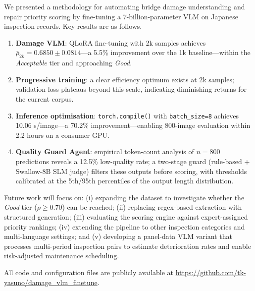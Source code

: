 \documentclass[twocolumn]{article}
\begin{document}
We presented a methodology for automating bridge damage understanding and
repair priority scoring by fine-tuning a 7-billion-parameter VLM on
Japanese inspection records.
Key results are as follows.
\begin{enumerate}[leftmargin=*,itemsep=1pt]
  \item \textbf{Damage VLM}: QLoRA fine-tuning with 2k samples achieves
        $\bar{\rho}_{2k}=0.6850\pm0.0814$---a 5.5\% improvement over the
        1k baseline---within the \textit{Acceptable} tier and approaching
        \textit{Good}.
  \item \textbf{Progressive training}: a clear efficiency optimum exists
        at 2k samples; validation loss plateaus beyond this scale, indicating
        diminishing returns for the current corpus.
  \item \textbf{Inference optimisation}: \texttt{torch.compile()} with
        \texttt{batch\_size=8} achieves 10.06 s/image---a 70.2\%
        improvement---enabling 800-image evaluation within 2.2 hours on a
        consumer GPU.
  \item \textbf{Quality Guard Agent}: empirical token-count analysis of
        $n=800$ predictions reveals a 12.5\% low-quality rate; a two-stage
        guard (rule-based + Swallow-8B SLM judge) filters these outputs
        before scoring, with thresholds calibrated at the 5th/95th
        percentiles of the output length distribution.
\end{enumerate}

Future work will focus on: (i) expanding the dataset to investigate
whether the \textit{Good} tier ($\bar{\rho}\geq 0.70$) can be reached;
(ii) replacing regex-based extraction with structured generation;
(iii) evaluating the scoring engine against expert-assigned priority rankings;
(iv) extending the pipeline to other inspection categories and
multi-language settings; and (v) developing a panel-data VLM variant that
processes multi-period inspection pairs to estimate deterioration rates and
enable risk-adjusted maintenance scheduling.

All code and configuration files are publicly available at
\url{https://github.com/tk-yasuno/damage_vlm_finetune}.



\end{document}
